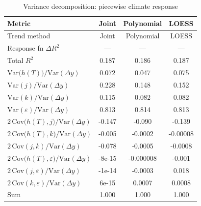 \begin{table}[htbp]
\centering
\caption{Variance decomposition: piecewise climate response}
\label{tab:variance_decomp_piecewise}

\small
\begin{tabular}{@{}lccc@{}}
\toprule
Metric & Joint & Polynomial & LOESS \\
\midrule
Trend method & Joint & Polynomial & LOESS \\
\midrule
Response fn $\Delta R^2$ & — & — & — \\
Total $R^2$ & 0.187 & 0.186 & 0.187 \\
\midrule
$\mathrm{Var}\!\big(h(T)\big)/\mathrm{Var}(\Delta y)$ & 0.072 & 0.047 & 0.075 \\
$\mathrm{Var}(j)/\mathrm{Var}(\Delta y)$ & 0.228 & 0.148 & 0.152 \\
$\mathrm{Var}(k)/\mathrm{Var}(\Delta y)$ & 0.115 & 0.082 & 0.082 \\
$\mathrm{Var}(\varepsilon)/\mathrm{Var}(\Delta y)$ & 0.813 & 0.814 & 0.813 \\
\midrule
$2\,\mathrm{Cov}\!\big(h(T),j\big)/\mathrm{Var}(\Delta y)$ & -0.147 & -0.090 & -0.139 \\
$2\,\mathrm{Cov}\!\big(h(T),k\big)/\mathrm{Var}(\Delta y)$ & -0.005 & -0.0002 & -0.00008 \\
$2\,\mathrm{Cov}(j,k)/\mathrm{Var}(\Delta y)$ & -0.078 & -0.0005 & -0.0008 \\
$2\,\mathrm{Cov}\!\big(h(T),\varepsilon\big)/\mathrm{Var}(\Delta y)$ & -8e-15 & -0.000008 & -0.001 \\
$2\,\mathrm{Cov}(j,\varepsilon)/\mathrm{Var}(\Delta y)$ & -1e-14 & -0.0003 & 0.018 \\
$2\,\mathrm{Cov}(k,\varepsilon)/\mathrm{Var}(\Delta y)$ & 6e-15 & 0.0007 & 0.0008 \\
\midrule
Sum & 1.000 & 1.000 & 1.000 \\
\bottomrule
\end{tabular}
\end{table}